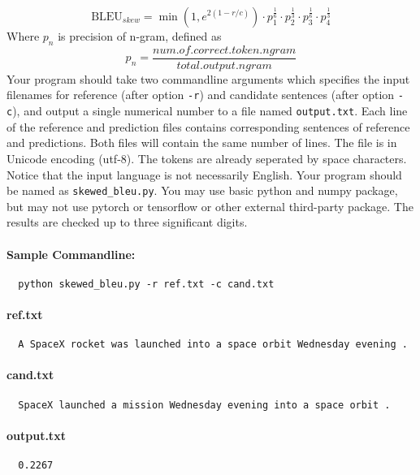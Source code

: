 \documentclass[12pt,letterpaper]{article}
\begin{document}
\[\mathrm{BLEU}_{skew} = \min(1, e^{2(1-r/c)}) \cdot p_1^\frac{1}{6} \cdot p_2^\frac{1}{3} \cdot p_3^\frac{1}{6} \cdot p_4^\frac{1}{3}\]
Where $p_n$ is precision of n-gram, defined as 
\[p_n=\frac{num.of.correct.token.ngram}{total.output.ngram}
    \]
Your program should take two commandline arguments which specifies the input filenames for reference (after option \texttt{-r}) and candidate sentences (after option \texttt{-c}), and output a single numerical number to a file named \texttt{output.txt}.
Each line of the reference and prediction files contains corresponding sentences of reference and predictions. 
Both files will contain the same number of  lines.
The file is in Unicode encoding (utf-8). The tokens are already seperated by space characters. Notice that the input language is not necessarily English.
Your program should be named as \texttt{skewed\_bleu.py}.
You may use basic python and numpy package, but may not use pytorch or tensorflow or other external third-party package.
The results are checked up to three significant digits. 

\paragraph{Sample Commandline:}
\begin{verbatim}
  python skewed_bleu.py -r ref.txt -c cand.txt
\end{verbatim}

\paragraph{ref.txt}
\begin{verbatim}
  A SpaceX rocket was launched into a space orbit Wednesday evening .
\end{verbatim}

\paragraph{cand.txt}
\begin{verbatim}
  SpaceX launched a mission Wednesday evening into a space orbit .
\end{verbatim}

\paragraph{output.txt}
\begin{verbatim}
  0.2267
\end{verbatim}
\end{document}
